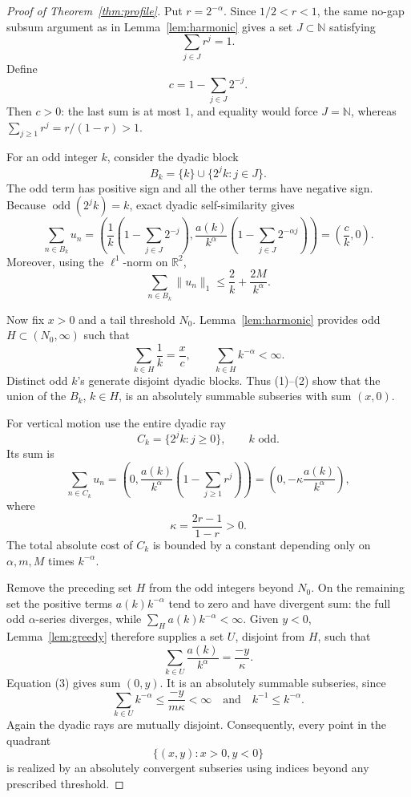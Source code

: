 \documentclass[11pt]{article}
\newcommand{\R}{\mathbb R}
\newcommand{\N}{\mathbb N}
\newcommand{\odd}{\operatorname{odd}}
\begin{document}
\begin{proof}[Proof of Theorem~\ref{thm:profile}]
Put $r=2^{-\alpha}$.  Since $1/2<r<1$, the same no-gap subsum argument as
in Lemma~\ref{lem:harmonic} gives a set $J\subset\N$ satisfying
\[
  \sum_{j\in J}r^j=1.
\]
Define
\[
  c=1-\sum_{j\in J}2^{-j}.
\]
Then $c>0$: the last sum is at most $1$, and equality would force
\(J=\N\), whereas \(\sum_{j\geq1}r^j=r/(1-r)>1\).

For an odd integer $k$, consider the dyadic block
\[
  B_k=\{k\}\cup\{2^j k:j\in J\}.
\]
The odd term has positive sign and all the other terms have negative sign.
Because \(\odd(2^j k)=k\), exact dyadic self-similarity gives
\[
 \sum_{n\in B_k}u_n
 =\left(\frac1k\left(1-\sum_{j\in J}2^{-j}\right),
 \frac{a(k)}{k^\alpha}\left(1-\sum_{j\in J}2^{-\alpha j}\right)\right)
 =\left(\frac ck,0\right).                                      \tag{1}
\]
Moreover, using the \(\ell^1\)-norm on \(\R^2\),
\[
 \sum_{n\in B_k}\|u_n\|_1
 \leq \frac2k+\frac{2M}{k^\alpha}.                            \tag{2}
\]

Now fix $x>0$ and a tail threshold $N_0$.  Lemma~\ref{lem:harmonic}
provides odd $H\subset(N_0,\infty)$ such that
\[
 \sum_{k\in H}\frac1k=\frac{x}{c},
 \qquad \sum_{k\in H}k^{-\alpha}<\infty.
\]
Distinct odd $k$'s generate disjoint dyadic blocks.  Thus (1)--(2) show
that the union of the $B_k$, $k\in H$, is an absolutely summable
subseries with sum \((x,0)\).

For vertical motion use the entire dyadic ray
\[
  C_k=\{2^j k:j\geq0\}, \qquad k\text{ odd}.
\]
Its sum is
\[
 \sum_{n\in C_k}u_n
 =\left(0,
 \frac{a(k)}{k^\alpha}\left(1-\sum_{j\geq1}r^j\right)\right)
 =\left(0,-\kappa\frac{a(k)}{k^\alpha}\right),                 \tag{3}
\]
where
\[
  \kappa=\frac{2r-1}{1-r}>0.
\]
The total absolute cost of $C_k$ is bounded by a constant depending only
on \(\alpha,m,M\) times $k^{-\alpha}$.

Remove the preceding set $H$ from the odd integers beyond $N_0$.  On the
remaining set the positive terms $a(k)k^{-\alpha}$ tend to zero and have
divergent sum: the full odd \(\alpha\)-series diverges, while
\(\sum_{H}a(k)k^{-\alpha}<\infty\).  Given $y<0$,
Lemma~\ref{lem:greedy} therefore supplies a set $U$, disjoint from $H$,
such that
\[
  \sum_{k\in U}\frac{a(k)}{k^\alpha}=\frac{-y}{\kappa}.
\]
Equation (3) gives sum \((0,y)\).  It is an absolutely summable subseries,
since
\[
  \sum_{k\in U}k^{-\alpha}\leq\frac{-y}{m\kappa}<\infty
  \quad\text{and}\quad k^{-1}\leq k^{-\alpha}.
\]
Again the dyadic rays are mutually disjoint.  Consequently, every point in
the quadrant
\[
  \{(x,y):x>0, y<0\}                                      \tag{4}
\]
is realized by an absolutely convergent subseries using indices beyond any
prescribed threshold.


\end{proof}
\end{document}
